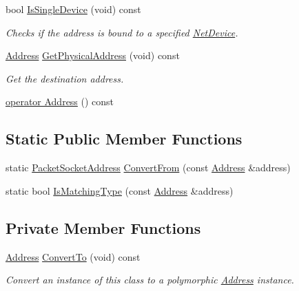 \begin{DoxyCompactItemize}
bool \hyperlink{classns3_1_1PacketSocketAddress_aecfc9109793ac22cdb166ef235b8d030}{Is\+Single\+Device} (void) const 
\begin{DoxyCompactList}\small\item\em Checks if the address is bound to a specified \hyperlink{classns3_1_1NetDevice}{Net\+Device}. \end{DoxyCompactList}\item 
\hyperlink{classns3_1_1Address}{Address} \hyperlink{classns3_1_1PacketSocketAddress_a1f05219b9376f5b10fd7f6189177bb28}{Get\+Physical\+Address} (void) const 
\begin{DoxyCompactList}\small\item\em Get the destination address. \end{DoxyCompactList}\item 
\hyperlink{classns3_1_1PacketSocketAddress_a8ffc5275ef5ec37d68120d4de3ffe87a}{operator Address} () const 
\end{DoxyCompactItemize}
\subsection*{Static Public Member Functions}
\begin{DoxyCompactItemize}
\item 
static \hyperlink{classns3_1_1PacketSocketAddress}{Packet\+Socket\+Address} \hyperlink{classns3_1_1PacketSocketAddress_ab90d0401de757d2da5bf1ad07af2ecf5}{Convert\+From} (const \hyperlink{classns3_1_1Address}{Address} \&address)
\item 
static bool \hyperlink{classns3_1_1PacketSocketAddress_a9426c99ec2c26c22d3920ca5c63ae1cd}{Is\+Matching\+Type} (const \hyperlink{classns3_1_1Address}{Address} \&address)
\end{DoxyCompactItemize}
\subsection*{Private Member Functions}
\begin{DoxyCompactItemize}
\item 
\hyperlink{classns3_1_1Address}{Address} \hyperlink{classns3_1_1PacketSocketAddress_a9f4e994ecfa502b4913861adc28343ce}{Convert\+To} (void) const 
\begin{DoxyCompactList}\small\item\em Convert an instance of this class to a polymorphic \hyperlink{classns3_1_1Address}{Address} instance. \end{DoxyCompactList}\end{DoxyCompactItemize}
